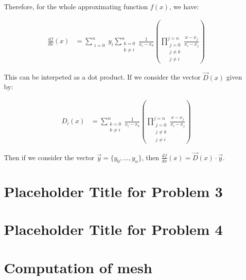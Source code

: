 \documentclass{article}
\begin{document}
Therefore, for the whole approximating function $f(x)$, we have:

\begin{align}
\frac{df}{dx}(x) & = \sum_{\begin{matrix}i=0\end{matrix}}^n
	y_i
	\sum_{\begin{matrix}k=0\\k\neq i\end{matrix}}^n
	\frac{1}{x_i - x_k}
	\left( \prod_{
		\begin{matrix} j = 0 \\ j \neq k\\j \neq i \end{matrix}}^{j=n}
		\frac{x - x_j}{x_i - x_j} \right)
\end{align}

This can be interpeted as a dot product.
If we consider the vector $\vec{D}(x)$ given by:

\begin{align}
D_i(x) & = 
	\sum_{\begin{matrix}k=0\\k\neq i\end{matrix}}^n
	\frac{1}{x_i - x_k}
	\left( \prod_{
		\begin{matrix} j = 0 \\ j \neq k\\j \neq i \end{matrix}}^{j=n}
		\frac{x - x_j}{x_i - x_j} \right)
\end{align}

Then if we consider the vector $\vec{y} = \{ y_0, \dots, y_n \}$,
	then $\frac{df}{dx}(x) = \vec{D}(x) \cdot \vec{y}$.

\section{Placeholder Title for Problem 3}

\section{Placeholder Title for Problem 4}

\section{Computation of mesh}
\end{document}
